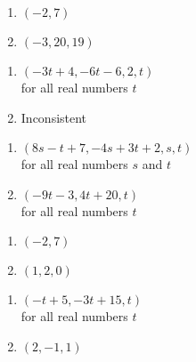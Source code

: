 \begin{multicols}{2}
\begin{enumerate}
\setcounter{enumi}{\value{HW}}

\item $(-2, 7)$
\item $(-3, 20, 19)$

\setcounter{HW}{\value{enumi}}
\end{enumerate}
\end{multicols}


\begin{multicols}{2}
\begin{enumerate}
\setcounter{enumi}{\value{HW}}

\item $(-3t + 4, -6t - 6, 2, t)$ \\
for all real numbers $t$
\item Inconsistent


\setcounter{HW}{\value{enumi}}
\end{enumerate}
\end{multicols}


\begin{multicols}{2}
\begin{enumerate}
\setcounter{enumi}{\value{HW}}


\item $(8s - t + 7, -4s + 3t + 2, s, t)$ \\ for all real numbers $s$ and $t$
\item $(-9t - 3, 4t + 20, t)$ \\ for all real numbers $t$


\setcounter{HW}{\value{enumi}}
\end{enumerate}
\end{multicols}


\begin{multicols}{2}
\begin{enumerate}
\setcounter{enumi}{\value{HW}}

\item $(-2, 7)$
\item $(1, 2, 0)$

\setcounter{HW}{\value{enumi}}
\end{enumerate}
\end{multicols}


\begin{multicols}{2}
\begin{enumerate}
\setcounter{enumi}{\value{HW}}


\item $(-t + 5, -3t + 15, t)$\\
for all real numbers $t$
\item $(2,-1,1)$


\setcounter{HW}{\value{enumi}}
\end{enumerate}
\end{multicols}


